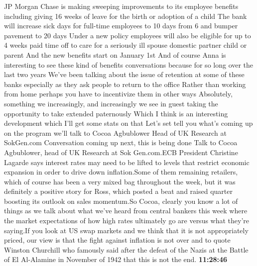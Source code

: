 \documentclass{article}%
\begin{document}
JP Morgan Chase is making sweeping improvements to its employee benefits including giving 16 weeks of leave for the birth or adoption of a child The bank will increase sick days for full{-}time employees to 10 days from 6 and bumper pavement to 20 days Under a new policy employees will also be eligible for up to 4 weeks paid time off to care for a seriously ill spouse domestic partner child or parent And the new benefits start on January 1st And of course Anna is interesting to see these kind of benefits conversations because for so long over the last two years We've been talking about the issue of retention at some of these banks especially as they ask people to return to the office Rather than working from home perhaps you have to incentivize them in other ways Absolutely, something we increasingly, and increasingly we see in guest taking the opportunity to take extended paternously Which I think is an interesting development which I'll get some stats on that Let's set tell you what's coming up on the program we'll talk to Cocoa Agbublower Head of UK Research at SokGen.com Conversation coming up next, this is being done  Talk to Cocoa Agbublower, head of UK Research at Sok Gen.com.ECB President Christine Lagarde says interest rates may need to be lifted to levels that restrict economic expansion in order to drive down inflation.Some of them remaining retailers, which of course has been a very mixed bag throughout the week, but it was definitely a positive story for Ross, which posted a beat and raised quarter boosting its outlook on sales momentum.So Cocoa, clearly you know a lot of things as we talk about what we've heard from central bankers this week where the market expectations of how high rates ultimately go are versus what they're saying.If you look at US swap markets and we think that it is not appropriately priced, our view is that the fight against inflation is not over and to quote Winston Churchill who famously said after the defeat of the Nazis at the Battle of El Al{-}Alamine in November of 1942 that this is not the end.%
\textbf{11:28:46}%
\newline%
\end{document}
